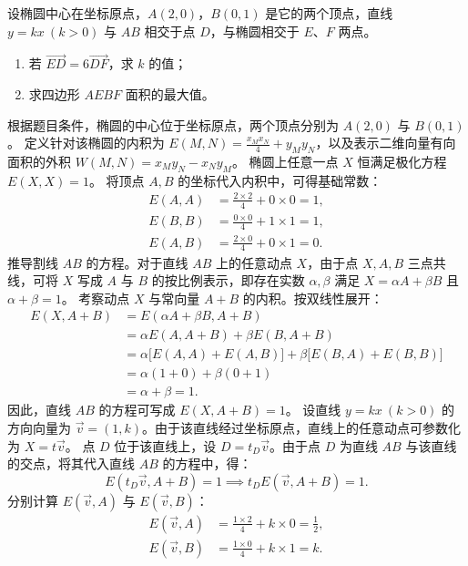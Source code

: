 \begin{example}
设椭圆中心在坐标原点，\(A(2,0)\)，\(B(0,1)\) 是它的两个顶点，直线 \(y = kx\ (k>0)\) 与 \(AB\) 相交于点 \(D\)，与椭圆相交于 \(E\)、\(F\) 两点。
\begin{enumerate}
    \item[(1)] 若 \(\overrightarrow{ED} = 6\overrightarrow{DF}\)，求 \(k\) 的值；
    \item[(2)] 求四边形 \(AEBF\) 面积的最大值。
\end{enumerate}
\end{example}
\begin{solution}
根据题目条件，椭圆的中心位于坐标原点，两个顶点分别为 $A(2,0)$ 与 $B(0,1)$。
定义针对该椭圆的内积为 $E(M, N) = \frac{x_M x_N}{4} + y_M y_N$，以及表示二维向量有向面积的外积 $W(M, N) = x_M y_N - x_N y_M$。
椭圆上任意一点 $X$ 恒满足极化方程 $E(X, X) = 1$。
将顶点 $A, B$ 的坐标代入内积中，可得基础常数：
\begin{align*}
E(A, A) &= \frac{2 \times 2}{4} + 0 \times 0 = 1, \\
E(B, B) &= \frac{0 \times 0}{4} + 1 \times 1 = 1, \\
E(A, B) &= \frac{2 \times 0}{4} + 0 \times 1 = 0.
\end{align*}
推导割线 $AB$ 的方程。对于直线 $AB$ 上的任意动点 $X$，由于点 $X, A, B$ 三点共线，可将 $X$ 写成 $A$ 与 $B$ 的按比例表示，即存在实数 $\alpha, \beta$ 满足 $X = \alpha A + \beta B$ 且 $\alpha + \beta = 1$。
考察动点 $X$ 与常向量 $A+B$ 的内积。按双线性展开：
\begin{align*}
E(X, A+B) &= E(\alpha A + \beta B, A+B) \\
&= \alpha E(A, A+B) + \beta E(B, A+B) \\
&= \alpha \big[E(A, A) + E(A, B)\big] + \beta \big[E(B, A) + E(B, B)\big] \\
&= \alpha (1 + 0) + \beta (0 + 1) \\
&= \alpha + \beta = 1.
\end{align*}
因此，直线 $AB$ 的方程可写成 $E(X, A+B) = 1$。
设直线 $y = kx\ (k>0)$ 的方向向量为 $\vec{v} = (1, k)$。由于该直线经过坐标原点，直线上的任意动点可参数化为 $X = t\vec{v}$。
点 $D$ 位于该直线上，设 $D = t_D\vec{v}$。由于点 $D$ 为直线 $AB$ 与该直线的交点，将其代入直线 $AB$ 的方程中，得：
\[ E(t_D\vec{v}, A+B) = 1 \implies t_D E(\vec{v}, A+B) = 1. \]
分别计算 $E(\vec{v}, A)$ 与 $E(\vec{v}, B)$：
\begin{align*}
E(\vec{v}, A) &= \frac{1 \times 2}{4} + k \times 0 = \frac{1}{2}, \\
E(\vec{v}, B) &= \frac{1 \times 0}{4} + k \times 1 = k.

\end{align*}
\end{solution}
